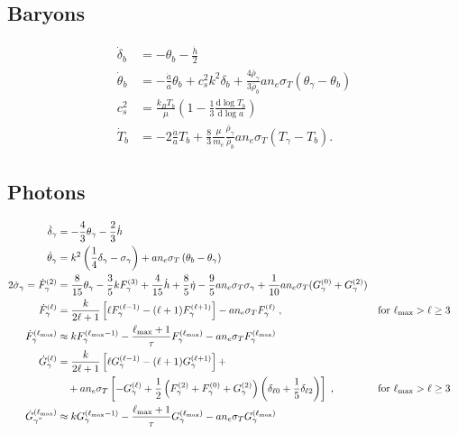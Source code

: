 \documentclass[a4paper]{article}
\newcommand{\dd}{\mathrm{d}}
\begin{document}
\subsection{Baryons}
\begin{align}
  \dot{\delta}_b &= -\theta_b - \frac{\dot{h}}{2} \\
  \dot{\theta}_b &= -\frac{\dot{a}}{a}\theta_b + c_s^2k^2\delta_b + \frac{4\overline{\rho}_\gamma}{3\overline{\rho}_b}a n_e \sigma_T (\theta_\gamma-\theta_b)\\
  c_s^2 &= \frac{k_B T_b}{\mu}\left(1-\frac{1}{3}\frac{\dd \log T_b}{\dd \log a}\right)\\
  \dot{T}_b &= -2\frac{\dot{a}}{a}T_b + \frac{8}{3}\frac{\mu}{m_e}\frac{\overline{\rho}_\gamma}{\overline{\rho}_b} a n_e \sigma_T (T_\gamma-T_b).
\end{align}

\subsection{Photons}
\begin{align}
  \dot{\delta}_\gamma &= -\frac{4}{3}\theta_\gamma - \frac{2}{3}\dot{h} \\
  \dot{\theta}_\gamma &= k^2\left( \frac{1}{4}\delta_\gamma - \sigma_\gamma \right) + a n_e \sigma_T\left(\theta_b-\theta_\gamma\right)\\
 2 \dot{\sigma}_\gamma = \dot{F}_{\gamma}^{(2)} &= \frac{8}{15}\theta_\gamma - \frac{3}{5}k F_{\gamma}^{(3)} + \frac{4}{15} \dot{h} + \frac{8}{5} \dot{\eta} - \frac{9}{5}a n_e \sigma_T \sigma_\gamma + \frac{1}{10}a n_e \sigma_T(G_{\gamma}^{(0)}+G_{\gamma}^{(2)})\\
  \dot{F}_{\gamma}^{(\ell)} &= \frac{k}{2\ell+1}\left[\ell F_{\gamma}^{(\ell-1)}-(\ell+1)F_{\gamma}^{(\ell+1)}\right] - a n_e \sigma_T F_{\gamma}^{(\ell)}\;,&&\text{for $\ell_\text{max}>\ell\ge3$}\\
  \dot{F}_{\gamma}^{(\ell_\text{max})} &\approx k F_{\gamma}^{(\ell_\text{max}-1)} - \frac{\ell_\text{max}+1}{\tau}F_{\gamma}^{(\ell_\text{max})} - a n_e \sigma_T F_{\gamma}^{(\ell_\text{max})} \\
  \dot{G}_{\gamma}^{(\ell)} &= \frac{k}{2\ell+1}\left[\ell G_{\gamma}^{(\ell-1)}-(\ell+1)G_{\gamma}^{(\ell+1)}\right] + \nonumber \\
  &\quad + a n_e \sigma_T \left[-G_{\gamma}^{(\ell)}+\frac{1}{2}\left(F_{\gamma}^{(2)}+F_{\gamma}^{(0)}+G_{\gamma}^{(2)}\right)\left(\delta_{\ell0}+\frac{1}{5}\delta_{\ell2}\right)\right]\;,&&\text{for $\ell_\text{max}>\ell\ge3$} \\
  \dot{G}_{\gamma"}^{(\ell_\text{max})} &\approx k G_{\gamma}^{(\ell_\text{max}-1)} - \frac{\ell_\text{max}+1}{\tau}G_{\gamma}^{(\ell_\text{max})} - a n_e \sigma_T G_{\gamma}^{(\ell_\text{max})}
\end{align}
\end{document}
